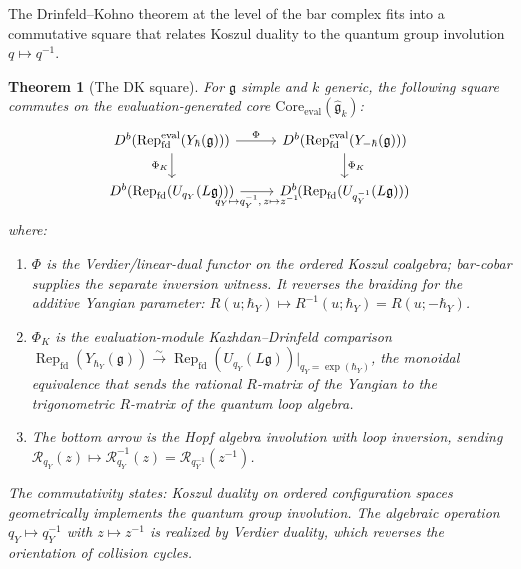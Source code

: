 \documentclass[11pt,reqno]{amsart}
\newtheorem{theorem}{Theorem}[section]
\theoremstyle{definition}
\theoremstyle{remark}
\DeclareMathOperator{\Rep}{Rep}
\newcommand{\fg}{\mathfrak{g}}
\newcommand{\cR}{\mathcal{R}}
\numberwithin{equation}{section}
\begin{document}
The Drinfeld--Kohno theorem at the level of the bar complex
fits into a commutative square that relates Koszul duality
to the quantum group involution $q \mapsto q^{-1}$.

\begin{theorem}[The DK square]
\label{thm:dk-square}
For $\fg$ simple and $k$ generic, the following square
commutes on the evaluation-generated core
${\mathrm{Core}}_{\mathrm{eval}}(\widehat{\mathfrak{g}}_k)$:
\begin{equation}\label{eq:dk-square}
\begin{tikzcd}
D^b(\Rep_{\mathrm{fd}}^{\mathrm{eval}}(Y_\hbar(\fg)))
 \ar[r, "\Phi"]
 \ar[d, "\Phi_K"']
& D^b(\Rep_{\mathrm{fd}}^{\mathrm{eval}}(Y_{-\hbar}(\fg)))
 \ar[d, "\Phi_K"]
\\
D^b(\Rep_{\mathrm{fd}}(U_{q_Y}(L\fg)))
 \ar[r, "{q_Y\mapsto q_Y^{-1},\,z\mapsto z^{-1}}"']
& D^b(\Rep_{\mathrm{fd}}(U_{q_Y^{-1}}(L\fg)))
\end{tikzcd}
\end{equation}
where:
\begin{enumerate}[label=(\roman*)]
\item $\Phi$ is the Verdier/linear-dual functor on the ordered Koszul
  coalgebra; bar-cobar supplies the separate inversion witness. It reverses
  the braiding for the additive Yangian parameter:
  $R(u; \hbar_Y) \mapsto R^{-1}(u; \hbar_Y)
  = R(u; -\hbar_Y)$.
\item $\Phi_K$ is the evaluation-module Kazhdan--Drinfeld comparison
  $\Rep_{\mathrm{fd}}(Y_{\hbar_Y}(\fg))
  \xrightarrow{\sim}
  \Rep_{\mathrm{fd}}(U_{q_Y}(L\fg))\big|_{q_Y = \exp(\hbar_Y)}$,
  the monoidal equivalence that sends the rational
  $R$-matrix of the Yangian to the trigonometric
  $R$-matrix of the quantum loop algebra.
\item The bottom arrow is the Hopf algebra involution with loop
  inversion, sending
  $\cR_{q_Y}(z) \mapsto \cR_{q_Y}^{-1}(z)
  = \cR_{q_Y^{-1}}(z^{-1})$.
\end{enumerate}
The commutativity states: Koszul duality on ordered
configuration spaces geometrically implements the quantum
group involution.  The algebraic operation
$q_Y \mapsto q_Y^{-1}$ with $z\mapsto z^{-1}$ is realized by Verdier duality, which
reverses the orientation of collision cycles.
\end{theorem}
\end{document}
